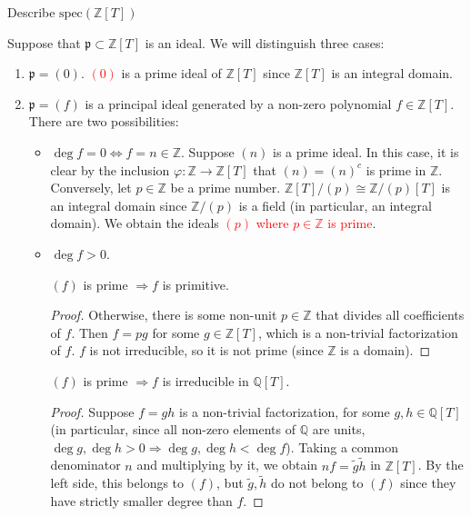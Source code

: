 \begin{problem}
Describe $\text{spec}(\mathbb{Z}[T])$
\begin{sol}
    Suppose that $\mathfrak{p} \subset \mathbb{Z}[T]$ is an ideal.
    We will distinguish three cases:
    \begin{enumerate}
        \item $\mathfrak{p} = (0)$.
        \textcolor{red}{$(0)$} is a prime ideal of $\mathbb{Z}[T]$ since $\mathbb{Z}[T]$ is an integral domain.
        \item $\mathfrak{p} = (f)$ is a principal ideal generated by a non-zero polynomial $f \in \mathbb{Z}[T]$.
        There are two possibilities:
        \begin{itemize}

            \item $\deg f = 0 \Leftrightarrow f = n \in \mathbb{Z}$.
            Suppose $(n)$ is a prime ideal.
            In this case, it is clear by the inclusion $\varphi:\mathbb{Z} \to \mathbb{Z}[T]$ that $(n) = (n)^c$ is prime in $\mathbb{Z}$.
            Conversely, let $p \in \mathbb{Z}$ be a prime number. $\mathbb{Z}[T]/(p) \cong \mathbb{Z}/(p)[T]$
            is an integral domain since $\mathbb{Z}/(p)$ is a field (in particular, an integral domain).
            We obtain the ideals \textcolor{red}{$(p)$ where $p \in \mathbb{Z}$ is prime}.

            \item $\deg f > 0$.
            \begin{claim}
                $(f)$ is prime $\Rightarrow f$ is primitive.
                \begin{proof}
                    Otherwise, there is some non-unit $p \in \mathbb{Z}$ that divides all coefficients of $f$.
                    Then $f = pg$ for some $g \in \mathbb{Z}[T]$, which is a non-trivial factorization of $f$.
                    $f$ is not irreducible, so it is not prime (since $\mathbb{Z}$ is a domain).
                \end{proof}
            \end{claim}
            \begin{claim}
                $(f)$ is prime $\Rightarrow f$ is irreducible in $\mathbb{Q}[T]$.
                \begin{proof}
                    Suppose $f = gh$ is a non-trivial factorization, for some $g,h \in \mathbb{Q}[T]$ (in particular, since all non-zero elements of $\mathbb{Q}$ are units, $\deg g, \deg h > 0 \Rightarrow \deg g, \deg h < \deg f$).
                    Taking a common denominator $n$ and multiplying by it, we obtain $nf = \tilde{g}\tilde{h}$ in $\mathbb{Z}[T]$.
                    By the left side, this belongs to $(f)$, but $\tilde{g}, \tilde{h}$ do not belong to $(f)$ since they have strictly smaller degree than $f$.
                \end{proof}
            \end{claim}


\end{itemize}
\end{enumerate}
\end{sol}
\end{problem}
